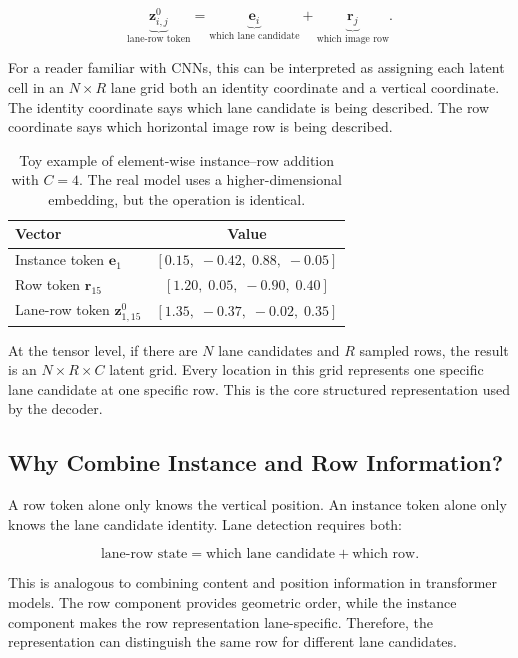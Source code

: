 \documentclass[conference]{IEEEtran}
\begin{document}
\begin{equation}
    \underbrace{\mathbf{z}_{i,j}^{0}}_{\text{lane-row token}}
    =
    \underbrace{\mathbf{e}_i}_{\text{which lane candidate}}
    +
    \underbrace{\mathbf{r}_j}_{\text{which image row}}.
\end{equation}

For a reader familiar with CNNs, this can be interpreted as assigning each latent cell in an $N \times R$ lane grid both an identity coordinate and a vertical coordinate. The identity coordinate says which lane candidate is being described. The row coordinate says which horizontal image row is being described.

\begin{table}[t]
\centering
\caption{Toy example of element-wise instance--row addition with $C=4$. The real model uses a higher-dimensional embedding, but the operation is identical.}
\label{tab:addition-example}
\begin{tabular}{lc}
\toprule
Vector & Value \\
\midrule
Instance token $\mathbf{e}_{1}$ & $[0.15,\;-0.42,\;0.88,\;-0.05]$ \\
Row token $\mathbf{r}_{15}$ & $[1.20,\;0.05,\;-0.90,\;0.40]$ \\
Lane-row token $\mathbf{z}_{1,15}^{0}$ & $[1.35,\;-0.37,\;-0.02,\;0.35]$ \\
\bottomrule
\end{tabular}
\end{table}

At the tensor level, if there are $N$ lane candidates and $R$ sampled rows, the result is an $N \times R \times C$ latent grid. Every location in this grid represents one specific lane candidate at one specific row. This is the core structured representation used by the decoder.

\subsection{Why Combine Instance and Row Information?}

A row token alone only knows the vertical position. An instance token alone only knows the lane candidate identity. Lane detection requires both:

\begin{equation}
    \text{lane-row state} = \text{which lane candidate} + \text{which row}.
\end{equation}

This is analogous to combining content and position information in transformer models. The row component provides geometric order, while the instance component makes the row representation lane-specific. Therefore, the representation can distinguish the same row for different lane candidates.
\end{document}
